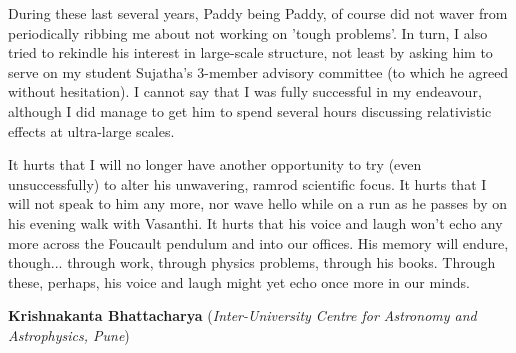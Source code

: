 \documentclass[prd, preprint, longbibliography, 11pt]{revtex4-1}
\begin{document}
During these last several years, Paddy being Paddy, of course did not waver from periodically ribbing me about not working on 'tough problems'. In turn, I also tried to rekindle his interest in large-scale structure, not least by asking him to serve on my student Sujatha's 3-member advisory committee (to which he agreed without hesitation). I cannot say that I was fully successful in my endeavour, although I did manage to get him to spend several hours discussing relativistic effects at ultra-large scales. 

It hurts that I will no longer have another opportunity to try (even unsuccessfully) to alter his unwavering, ramrod scientific focus. It hurts that I will not speak to him any more, nor wave hello while on a run as he passes by on his evening walk with Vasanthi. It hurts that his voice and laugh won't echo any more across the Foucault pendulum and into our offices. His memory will endure, though... through work, through physics problems, through his books. Through these, perhaps, his voice and laugh might yet echo once more in our minds.

\bigskip

\bigskip
\bigskip
\centerline{{\bf Krishnakanta Bhattacharya} ({\it Inter-University Centre for Astronomy and Astrophysics, Pune})}
\smallskip
{}
\end{document}
